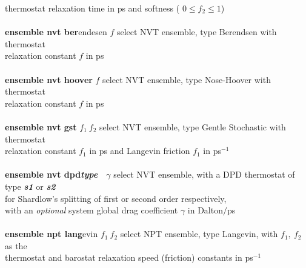 \begin{tabbing}
\>                                              \> thermostat relaxation time in ps and softness ( $0 \le f_{2} \le 1$) \\
\>                                              \> \\
\> {\bf ensemble nvt ber}endesen $f$            \> select NVT ensemble, type Berendsen with thermostat \\
\>                                              \> relaxation constant $f$ in ps \\
\>                                              \> \\
\> {\bf ensemble nvt hoover} $f$                \> select NVT ensemble, type Nose-Hoover with thermostat \\
\>                                              \> relaxation constant $f$ in ps \\
\>                                              \> \\
\> {\bf ensemble nvt gst} $f_{1}~f_{2}$         \> select NVT ensemble, type Gentle Stochastic with thermostat \\
\>                                              \> relaxation constant $f_{1}$ in ps and Langevin friction $f_{1}$ in ps$^{-1}$ \\
\>                                              \> \\
\> {\bf ensemble nvt dpd}\textrm{\textit{\textbf{type}}}~~$\gamma$
                                                \> select NVT ensemble, with a DPD thermostat of type
                                                \textrm{\textit{\textbf{s1}}} or \textrm{\textit{\textbf{s2}}} \\
\>                                              \> for Shardlow's splitting of first or second order respectively, \\
\>                                              \> with an {\em optional} system global drag coefficient $\gamma$ in Dalton$/$ps \\
\>                                              \> \\
\> {\bf ensemble npt lang}evin $f_{1}~f_{2}$    \> select NPT ensemble, type Langevin, with $f_{1},~f_{2}$ as the \\
\>                                              \> thermostat and barostat relaxation speed (friction) constants in ps$^{-1}$ \\

\end{tabbing}
